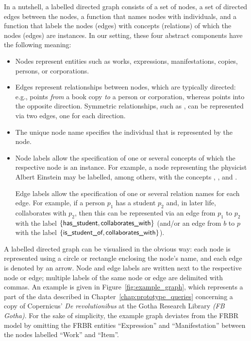 In a nutshell, a labelled directed graph consists of a set of nodes, a set of directed edges between
the nodes, a function that names nodes with individuals,
and a function that labels the nodes (edges) with concepts (relations)
of which the nodes (edges) are instances.
In our setting, these four abstract components have the following meaning:
%
\begin{itemize}
  \item 
    Nodes represent entities such as works, expressions, manifestations, copies,
    persons, or corporations.
  \item 
    Edges represent relationships between nodes, which are typically directed:
    e.g.,  points \emph{from} a book copy \emph{to} a person or corporation,
    whereas  points into the opposite direction.
    Symmetric relationships, such as ,
    can be represented via two edges, one for each direction.
  \item 
    The unique node name specifies the individual that is represented by the node.
  \item 
    Node labels allow the specification of one or several concepts
    of which the respective node is an instance.
    For example, a node representing the physicist Albert Einstein
    may be labelled, among others, with the concepts , ,
    and .

    Edge labels allow the specification of one or several relation names for each edge.
    For example, if a person $p_1$ has a student $p_2$ and, in later life, 
    collaborates with $p_2$, then this can be represented via an edge from $p_1$ to $p_2$
    with the label $\{\textsf{has\_student},\textsf{collaborates\_with}\}$
    (and/or an edge from $b$ to $p$ with the label $\{\textsf{is\_student\_of},\textsf{collaborates\_with}\}$).
\end{itemize}
%
A labelled directed graph can be visualised in the obvious way:
each node is represented using a circle or rectangle
enclosing the node's name,
and each edge is denoted by an arrow.
Node and edge labels are written next to the respective node or edge;
multiple labels of the same node or edge are delimited with commas.
An example is given in Figure~\ref{fig:example_graph},
which represents a part of the data described in Chapter~\ref{chap:prototype_queries}
concerning a copy of Copernicus' \emph{De revolutionibus} at the
Gotha Research Library \emph{(FB Gotha)}.
For the sake of simplicity, the example graph deviates from the FRBR model
by omitting the FRBR entities \enquote{Expression} and \enquote{Manifestation}
between the nodes labelled \enquote{Work} and \enquote{Item}.

